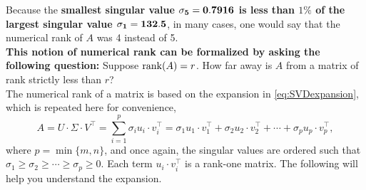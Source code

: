 Because the \textbf{smallest singular value ${\bf \sigma_5 = 0.7916}$  is less than $1\%$ of the largest singular value ${\bf \sigma_1=132.5}$}, in many cases, one would say that the numerical rank of $A$ was 4 instead of 5.\\

\textbf{This notion of numerical rank can be formalized by asking the following question:} Suppose $\mathrm{rank}(A) = r$. How far away is $A$ from a matrix of rank strictly less than $r$?\\

The numerical rank of a matrix is based on the expansion in \eqref{eq:SVDexpansion}, which is repeated here for convenience,
$$A=U \cdot \Sigma \cdot V^\top = \sum_{i=1}^{p} \sigma_i u_i \cdot v_i^\top = \sigma_1 u_1 \cdot v_1^\top + \sigma_2 u_2 \cdot v_2^\top + \cdots + \sigma_p u_p \cdot v_p^\top,  $$
where $p=\min\{m, n\}$, and once again, the singular values are ordered such that $\sigma_1 \ge \sigma_2\ge \cdots \ge \sigma_p \ge0.$ Each term $u_i \cdot v_i^\top$ is a rank-one matrix. The following will help you understand the expansion. \\

